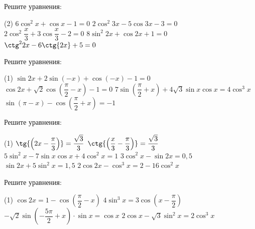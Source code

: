 \begin{class}[number=5]
	\begin{listofex}
		\item Решите уравнения:
		\begin{tasks}(2)
			\task \( 6\cos^2{x}+\cos{x}-1=0 \)
			\task \( 2\cos^2{3x}-5\cos{3x}-3=0 \)
			\task \( 2\cos^2{\dfrac{x}{3}}+3\cos{\dfrac{x}{3}}-2=0 \)
			\task \( 8\sin^2{2x}+\cos{2x}+1=0 \)
			\task \( \ctg^2{2x}-6\ctg{2x}+5=0 \)
		\end{tasks}
		\item Решите уравнения:
		\begin{tasks}(1)
			\task \( \sin{2x}+2\sin{(-x)}+\cos{(-x)}-1=0 \)
			\task \( \cos{2x}+\sqrt{2}\cos{\left( \dfrac{\pi}{2}-x \right)}-1=0 \)
			\task \( 7\sin{ \left( \dfrac{\pi}{2}+x \right) +4\sqrt{3}\sin{x} \cos{x} = 4 \cos^3{x}  } \)
			\task \( \sin{(\pi-x)}- \cos{\left( \dfrac{\pi}{2}+x \right) = -1 }  \)
		\end{tasks}
	\end{listofex}
\end{class}
	
\begin{class}[number=6]
	\begin{listofex}
		\item Решите уравнения:
		\begin{tasks}(1)
			\task \( \tg{\left( 2x-\dfrac{\pi}{3} \right)}=\dfrac{\sqrt{3}}{3} \)
			\task \( \ctg{\left( \dfrac{x}{3}-\dfrac{\pi}{3} \right)} = \dfrac{\sqrt{3}}{3} \)
			\task \( 5 \sin^2{x}-7\sin{x} \cos{x} + 4 \cos^2{x}=1 \)
			\task \( 3\cos^2{x}-\sin{2x}=0,5 \)
			\task \( \sin{2x}+5\sin^2{x}=1,5 \)
			\task \( 2\cos{2x}-\cos^3{x}=2-16\cos^2{x} \)
		\end{tasks}
		\item Решите уравнения:
		\begin{tasks}(1)
			\task \( \cos{2x}=1-\cos{\left( \dfrac{\pi}{2}-x \right) } \)
			\task \( 4\sin^3{x}=3\cos{\left( x-\dfrac{\pi}{2} \right) } \)
			\task \( -\sqrt{2}\sin{\left( -\dfrac{5\pi}{2}+x \right) \cdot \sin{x} = \cos{x} } \)
			\task \( 2\cos{x}-\sqrt{3}\sin^2{x}=2\cos^3{x} \)
		\end{tasks}
	\end{listofex}
\end{class}
	
